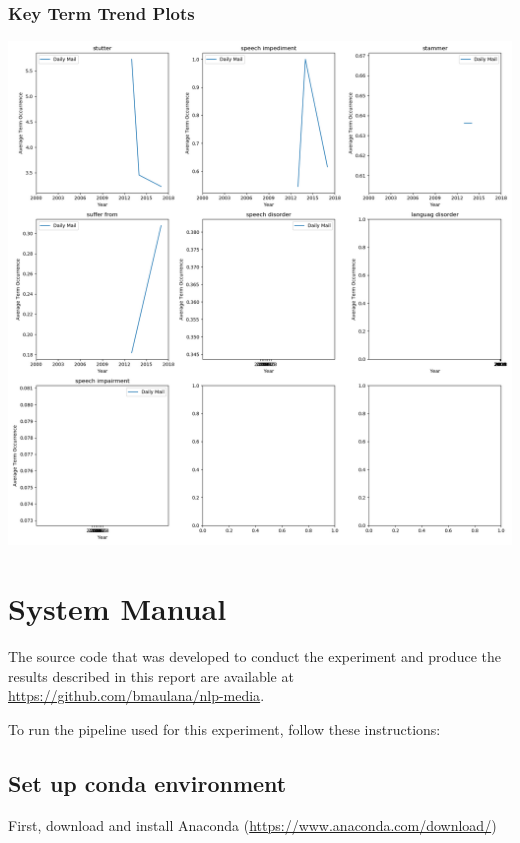 \documentclass{report}
\begin{document}
\subsection{Key Term Trend Plots}
\includegraphics[width=\textwidth]{raw/speech-impairment-terms.png}

\chapter{System Manual}

The source code that was developed to conduct the experiment and produce the results described in this report are available at \url{https://github.com/bmaulana/nlp-media}.

\vspace{1em}

\noindent To run the pipeline used for this experiment, follow these instructions:

\section{Set up conda environment}

First, download and install Anaconda (\url{https://www.anaconda.com/download/})

\vspace{1em}
\end{document}
